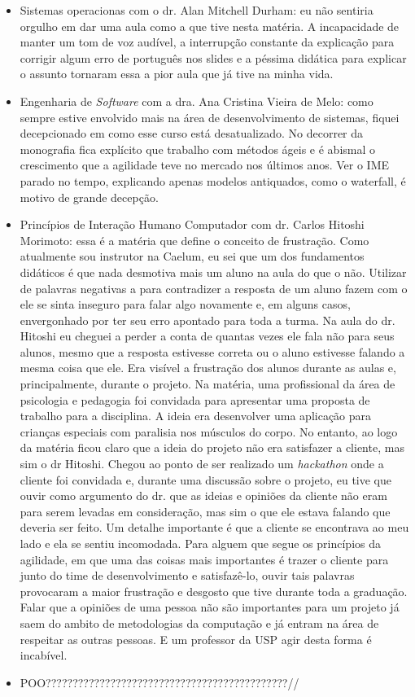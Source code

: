 \documentclass[titlepage,a4paper]{article}
\begin{document}
\begin{itemize}
	\item Sistemas operacionas com o dr. Alan Mitchell Durham: eu não sentiria orgulho em dar uma aula como a que tive nesta matéria. A incapacidade de manter um tom de voz audível, a interrupção constante da explicação para corrigir algum erro de português nos slides e a péssima didática para explicar o assunto tornaram essa a pior aula que já tive na minha vida.
	\item Engenharia de \textit{Software} com a dra. Ana Cristina Vieira de Melo: como sempre estive envolvido mais na área de desenvolvimento de sistemas, fiquei decepcionado em como esse curso está desatualizado. No decorrer da monografia fica explícito que trabalho com métodos ágeis e é abismal o crescimento que a agilidade teve no mercado nos últimos anos. Ver o IME parado no tempo, explicando apenas modelos antiquados, como o waterfall, é motivo de grande decepção.
	\item Princípios de Interação Humano Computador com dr. Carlos Hitoshi Morimoto: essa é a matéria que define o conceito de frustração. Como atualmente sou instrutor na Caelum, eu sei que um dos fundamentos didáticos é que nada desmotiva mais um aluno na aula do que o não. Utilizar de palavras negativas a para contradizer a resposta de um aluno fazem com o ele se sinta inseguro para falar algo novamente e, em alguns casos, envergonhado por ter seu erro apontado para toda a turma. Na aula do dr. Hitoshi eu cheguei a perder a conta de quantas vezes ele fala não para seus alunos, mesmo que a resposta estivesse correta ou o aluno estivesse falando a mesma coisa que ele. Era visível a frustração dos alunos durante as aulas e, principalmente, durante o projeto. Na matéria, uma profissional da área de psicologia e pedagogia foi convidada para apresentar uma proposta de trabalho para a disciplina. A ideia era desenvolver uma aplicação para crianças especiais com paralisia nos músculos do corpo. No entanto, ao logo da matéria ficou claro que a ideia do projeto não era satisfazer a cliente, mas sim o dr Hitoshi. Chegou ao ponto de ser realizado um \textit{hackathon} onde a cliente foi convidada e, durante uma discussão sobre o projeto, eu tive que ouvir como argumento do dr. que as ideias e opiniões da cliente não eram para serem levadas em consideração, mas sim o que ele estava falando que deveria ser feito. Um detalhe importante é que a cliente se encontrava ao meu lado e ela se sentiu incomodada. Para alguem que segue os princípios da agilidade, em que uma das coisas mais importantes é trazer o cliente para junto do time de desenvolvimento e satisfazê-lo, ouvir tais palavras provocaram a maior frustração e desgosto que tive durante toda a graduação. Falar que a opiniões de uma pessoa não são importantes para um projeto já saem do ambito de metodologias da computação e já entram na área de respeitar as outras pessoas. E um professor da USP agir desta forma é incabível.
	\item POO?????????????????????????????????????????????//
\end{itemize}
\end{document}
